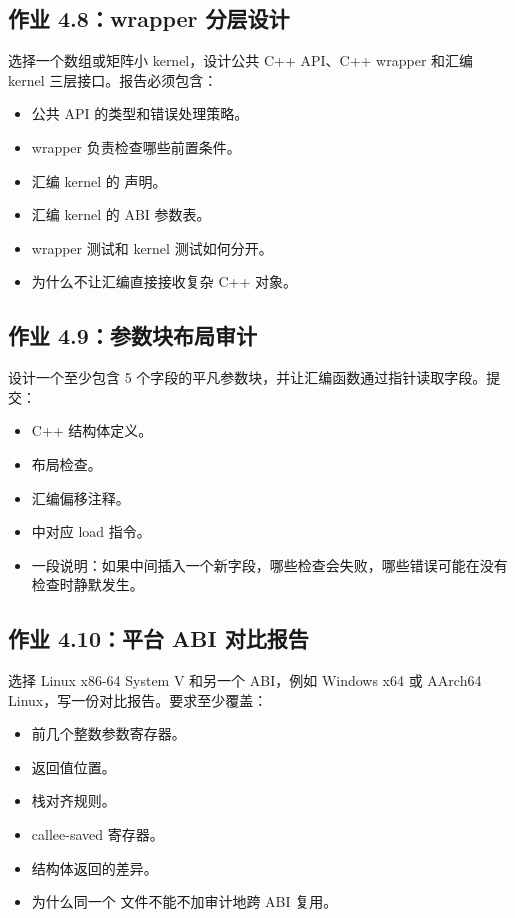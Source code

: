 \begin{exercisebox}
\subsection*{作业 4.8：wrapper 分层设计}

选择一个数组或矩阵小 kernel，设计公共 C++ API、C++ wrapper 和汇编 kernel 三层接口。报告必须包含：

\begin{itemize}
  \item 公共 API 的类型和错误处理策略。
  \item wrapper 负责检查哪些前置条件。
  \item 汇编 kernel 的  声明。
  \item 汇编 kernel 的 ABI 参数表。
  \item wrapper 测试和 kernel 测试如何分开。
  \item 为什么不让汇编直接接收复杂 C++ 对象。
\end{itemize}

\subsection*{作业 4.9：参数块布局审计}

设计一个至少包含 5 个字段的平凡参数块，并让汇编函数通过指针读取字段。提交：

\begin{itemize}
  \item C++ 结构体定义。
  \item {} 布局检查。
  \item 汇编偏移注释。
  \item {} 中对应 load 指令。
  \item 一段说明：如果中间插入一个新字段，哪些检查会失败，哪些错误可能在没有检查时静默发生。
\end{itemize}

\subsection*{作业 4.10：平台 ABI 对比报告}

选择 Linux x86-64 System V 和另一个 ABI，例如 Windows x64 或 AArch64 Linux，写一份对比报告。要求至少覆盖：

\begin{itemize}
  \item 前几个整数参数寄存器。
  \item 返回值位置。
  \item 栈对齐规则。
  \item callee-saved 寄存器。
  \item 结构体返回的差异。
  \item 为什么同一个  文件不能不加审计地跨 ABI 复用。
\end{itemize}


\end{exercisebox}
